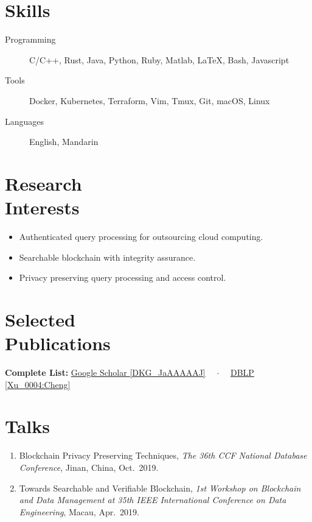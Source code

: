 \documentclass{mycv}
\begin{document}
\section{Skills}

\begin{description}
  \item[Programming] C/C++, Rust, Java, Python, Ruby, Matlab, \LaTeX, Bash, Javascript
  \item[Tools] Docker, Kubernetes, Terraform, Vim, Tmux, Git, macOS, Linux
  \item[Languages] English, Mandarin
\end{description}

\section{Research \\ Interests}

\begin{itemize}
  \item Authenticated query processing for outsourcing cloud computing.
  \item Searchable blockchain with integrity assurance.
  \item Privacy preserving query processing and access control.
\end{itemize}

\section{Selected \\ Publications}%

\textbf{Complete List:}
\href{https://scholar.google.com/citations?user=DKG_JaAAAAAJ}{Google Scholar \textsf{\footnotesize [DKG\_JaAAAAAJ]}}%
{~~$\cdot$~~}%
\href{https://dblp.org/pers/hd/x/Xu_0004:Cheng}{DBLP \textsf{\footnotesize [Xu\_0004:Cheng]}}%



\section{Talks}

\begin{enumerate}
  \item Blockchain Privacy Preserving Techniques, \emph{The 36th CCF National Database Conference}, Jinan, China, Oct.~2019.
  \item Towards Searchable and Verifiable Blockchain, \emph{1st Workshop on Blockchain and Data Management at 35th IEEE International Conference on Data Engineering}, Macau, Apr.~2019.
\end{enumerate}
\end{document}
